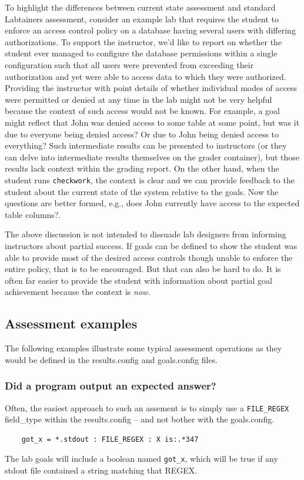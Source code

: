 \documentclass[12pt]{article}
\begin{document}
To highlight the differences between current state assessment and standard Labtainers assessment, consider an example
lab that requires the student to enforce an access control policy on a database having several users with differing
authorizations.  To support the instructor, we'd like to report on whether the student ever managed to configure the
database permissions within a single configuration such that all users were prevented from exceeding their authorization and 
yet were able to access data to which they were authorized.  Providing the instructor with point details of whether individual
modes of access were permitted or denied at any time in the lab might not be very helpful because the context of such access
would not be known.  For example, a goal might reflect that John was denied access to some table at some point, but was it due to everyone being 
denied access?  Or due to John being denied access to everything?  Such intermediate results can be presented to instructors
(or they can delve into intermediate results themselves on the grader container), but those results lack context within the 
grading report.  On the other hand, when the student runs {\tt checkwork}, the context is clear and we can provide feedback
to the student about the current state of the system relative to the goals.  Now the questions are better formed, e.g., 
does John currently have access to the expected table columns?.

The above discussion is not intended to dissuade lab designers from informing instructors about partial success.  If goals
can be defined to show the student was able to provide most of the desired access controls though unable to enforce the entire policy, 
that is to be encouraged.  But that can also be hard to do.  It is often far easier to provide the student with information about partial
goal achievement because the context is \textit{now}.

\subsection{Assessment examples}
\label{examples}
The following examples illustrate some typical assessment operations as they would
be defined in the results.config and goals.config files.

\subsubsection{Did a program output an expected answer?}
Often, the easiest approach to such an assement is to simply use a {\tt FILE\_REGEX} field\_type
within the results.config -- and not bother with the goals.config.
\begin{verbatim}
    got_x = *.stdout : FILE_REGEX : X is:.*347
\end{verbatim}
The lab goals will include a boolean named {\tt got\_x}, which will be true if any stdout file
contained a string matching that REGEX.
\end{document}
